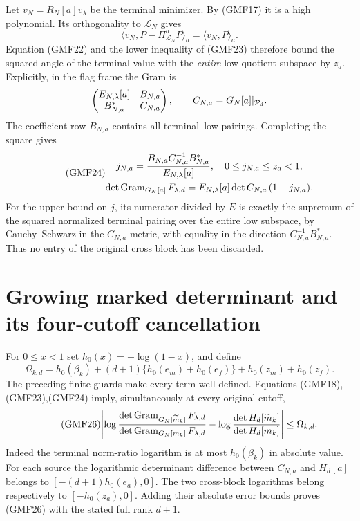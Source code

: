 \documentclass[11pt,a4paper]{article}
\begin{document}
Let \(v_N=R_N[a]v_\lambda\) be the terminal minimizer.
By (GMF17) it is a high polynomial.  Its orthogonality to
\(\mathcal L_N\) gives
\[
 \langle v_N,P-\Pi_{\mathcal L_N}^aP\rangle_a
                       =\langle v_N,P\rangle_a.
\]
Equation (GMF22) and the lower inequality of (GMF23)
therefore bound the squared angle of the terminal value
with the \emph{entire} low quotient subspace by \(z_a\).
Explicitly, in the flag frame the Gram is
\[
 \begin{pmatrix} E_{N,\lambda}[a]&B_{N,a}\\
                 B_{N,a}^*&C_{N,a}\end{pmatrix},\qquad
 C_{N,a}=G_N[a]|_{\mathcal P_d}.
\]
The coefficient row \(B_{N,a}\) contains all terminal--low
pairings.  Completing the square gives
\begin{equation}\tag{GMF24}
\begin{gathered}
 j_{N,a}=
 \frac{B_{N,a}C_{N,a}^{-1}B_{N,a}^*}{E_{N,\lambda}[a]},
 \quad 0\le j_{N,a}\le z_a<1,\\
 \det\operatorname{Gram}_{G_N[a]}F_{\lambda,d}
 =E_{N,\lambda}[a]\det C_{N,a}\,(1-j_{N,a}).
\end{gathered}
\end{equation}
For the upper bound on \(j\), its numerator divided by \(E\)
is exactly the supremum of the squared normalized terminal
pairing over the entire low subspace, by Cauchy--Schwarz
in the \(C_{N,a}\)-metric, with equality in the direction
\(C_{N,a}^{-1}B_{N,a}^*\).
Thus no entry of the original cross block has been discarded.

\section{Growing marked determinant and its four-cutoff cancellation}

For \(0\le x<1\) set \(h_0(x)=-\log(1-x)\), and define
\begin{equation}\tag{GMF25}
 \Omega_{k,d}=
 h_0(\beta_k)
 +(d+1)\{h_0(e_m)+h_0(e_f)\}
 +h_0(z_m)+h_0(z_f).
\end{equation}
The preceding finite guards make every term well defined.
Equations (GMF18),(GMF23),(GMF24) imply, simultaneously at
every original cutoff,
\begin{equation}\tag{GMF26}
\begin{split}
 \left|
 \log\frac{\det\operatorname{Gram}_{G_N[\widetilde m_k]}F_{\lambda,d}}
              {\det\operatorname{Gram}_{G_N[m_k]}F_{\lambda,d}}
 -\log\frac{\det H_d[\widetilde m_k]}{\det H_d[m_k]}
 \right|\le\Omega_{k,d}.
\end{split}
\end{equation}
Indeed the terminal norm-ratio logarithm is at most
\(h_0(\beta_k)\) in absolute value.
For each source the logarithmic determinant difference
between \(C_{N,a}\) and \(H_d[a]\) belongs to
\([-(d+1)h_0(e_a),0]\).
The two cross-block logarithms belong respectively to
\([-h_0(z_a),0]\).
Adding their absolute error bounds proves (GMF26) with
the stated full rank \(d+1\).
\end{document}
